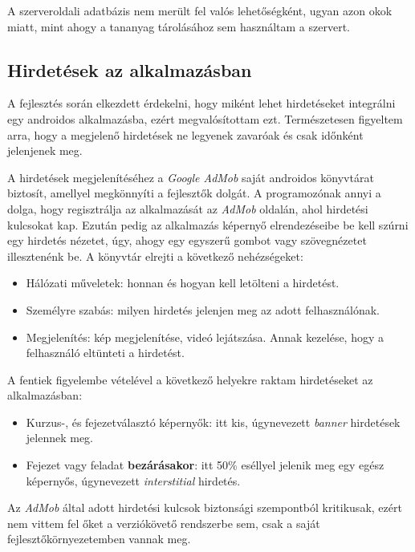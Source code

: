 \documentclass[12pt,a4paper]{article}
\begin{document}
	A szerveroldali adatbázis nem merült fel valós lehetőségként, ugyan azon okok miatt, mint ahogy a tananyag tárolásához sem használtam a szervert.

	\subsection{Hirdetések az alkalmazásban}
	
	A fejlesztés során elkezdett érdekelni, hogy miként lehet hirdetéseket integrálni egy androidos alkalmazásba, ezért megvalósítottam ezt. Természetesen figyeltem arra, hogy a megjelenő hirdetések ne legyenek zavaróak és csak időnként jelenjenek meg.
	
	A hirdetések megjelenítéséhez a \textit{Google AdMob} saját androidos könyvtárat biztosít, amellyel megkönnyíti a fejlesztők dolgát. A programozónak annyi a dolga, hogy regisztrálja az alkalmazását az \textit{AdMob} oldalán, ahol hirdetési kulcsokat kap. Ezután pedig az alkalmazás képernyő elrendezéseibe be kell szúrni egy hirdetés nézetet, úgy, ahogy egy egyszerű gombot vagy szövegnézetet illesztenénk be. A könyvtár elrejti a következő nehézségeket:
	
	\begin{itemize}
		\item Hálózati műveletek: honnan és hogyan kell letölteni a hirdetést.
		\item Személyre szabás: milyen hirdetés jelenjen meg az adott felhasználónak.
		\item Megjelenítés: kép megjelenítése, videó lejátszása. Annak kezelése, hogy a felhasználó eltünteti a hirdetést.
	\end{itemize} 

	A fentiek figyelembe vételével a következő helyekre raktam hirdetéseket az alkalmazásban:
	
	\begin{itemize}
		\item Kurzus-, és fejezetválasztó képernyők: itt kis, úgynevezett \textit{banner} hirdetések jelennek meg.
		\item Fejezet vagy feladat \textbf{bezárásakor}: itt 50\% eséllyel jelenik meg egy egész képernyős, úgynevezett \textit{interstitial} hirdetés.
	\end{itemize}

	Az \textit{AdMob} által adott hirdetési kulcsok biztonsági szempontból kritikusak, ezért nem vittem fel őket a verziókövető rendszerbe sem, csak a saját fejlesztőkörnyezetemben vannak meg. 
	
\end{document}
